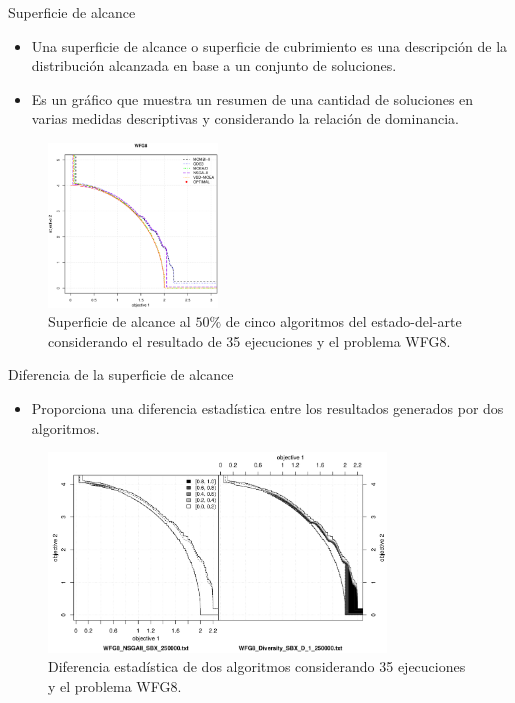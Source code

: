 \documentclass{beamer}
\begin{document}
\begin{frame}{Superficie de alcance}
\begin{itemize}
\item Una superficie de alcance o superficie de cubrimiento es una descripción de la distribución alcanzada en base a un conjunto de soluciones.
\item Es un gráfico que muestra un resumen de una cantidad de soluciones en varias medidas descriptivas y considerando la relación de dominancia.
\end{itemize}
\begin{figure}[H]
\includegraphics[width=0.4\textwidth]{superficie_alcance_WFG8.eps}
\centering
\caption{\scriptsize Superficie de alcance al $50\%$ de cinco algoritmos del estado-del-arte considerando el resultado de 35 ejecuciones y el problema WFG8.}
\end{figure}
\end{frame}


\begin{frame}{Diferencia de la superficie de alcance}
\begin{itemize}
\item Proporciona una diferencia estadística entre los resultados generados por dos algoritmos.
\end{itemize}
\begin{figure}[H]
 \includegraphics[width=0.8\textwidth]{diff_plot.png} 
\centering
\caption{\scriptsize Diferencia estadística de dos algoritmos considerando 35 ejecuciones y el problema WFG8.}
\end{figure}

\end{frame}
\end{document}
